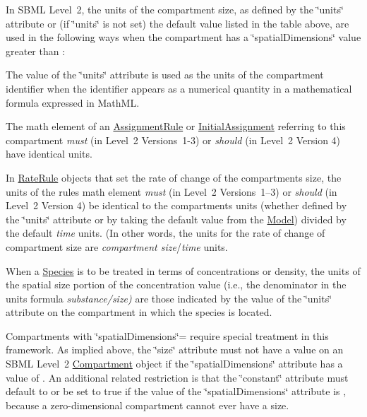 In S\+B\+ML Level~2, the units of the compartment size, as defined by the \char`\"{}units\char`\"{} attribute or (if \char`\"{}units\char`\"{} is not set) the default value listed in the table above, are used in the following ways when the compartment has a \char`\"{}spatial\+Dimensions\char`\"{} value greater than {}\+: 
\begin{DoxyItemize}
\item The value of the \char`\"{}units\char`\"{} attribute is used as the units of the compartment identifier when the identifier appears as a numerical quantity in a mathematical formula expressed in Math\+ML.


\item The {\ttfamily math} element of an \hyperlink{class_assignment_rule}{Assignment\+Rule} or \hyperlink{class_initial_assignment}{Initial\+Assignment} referring to this compartment {\itshape must} (in Level~2 Versions~1-\/3) or {\itshape should} (in Level~2 Version 4) have identical units.


\item In \hyperlink{class_rate_rule}{Rate\+Rule} objects that set the rate of change of the compartment\textquotesingle{}s size, the units of the rule\textquotesingle{}s {\ttfamily math} element {\itshape must} (in Level~2 Versions~1--3) or {\itshape should} (in Level~2 Version 4) be identical to the compartment\textquotesingle{}s units (whether defined by the \char`\"{}units\char`\"{} attribute or by taking the default value from the \hyperlink{class_model}{Model}) divided by the default {\itshape time} units. (In other words, the units for the rate of change of compartment size are {\itshape compartment size}/{\itshape time} units.


\item When a \hyperlink{class_species}{Species} is to be treated in terms of concentrations or density, the units of the spatial size portion of the concentration value (i.\+e., the denominator in the units formula {\itshape substance/{\itshape size})} are those indicated by the value of the \char`\"{}units\char`\"{} attribute on the compartment in which the species is located. 
\end{DoxyItemize}

Compartments with \char`\"{}spatial\+Dimensions\char`\"{}={} require special treatment in this framework. As implied above, the \char`\"{}size\char`\"{} attribute must not have a value on an S\+B\+ML Level~2 \hyperlink{class_compartment}{Compartment} object if the \char`\"{}spatial\+Dimensions\char`\"{} attribute has a value of {}. An additional related restriction is that the \char`\"{}constant\char`\"{} attribute must default to or be set to {\ttfamily true} if the value of the \char`\"{}spatial\+Dimensions\char`\"{} attribute is {}, because a zero-\/dimensional compartment cannot ever have a size.

